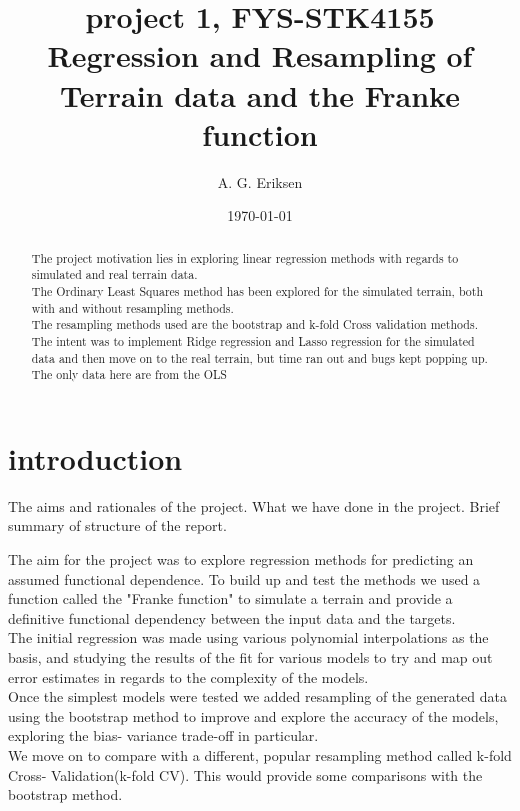 \documentclass[12pt]{revtex4-2}
\begin{document}
\title{%
	project 1, FYS-STK4155 \\
	\large Regression and Resampling of Terrain data and the Franke function}
\author{A. G. Eriksen}
\date{\today}
\begin{abstract}
	The project motivation lies in exploring linear regression methods with regards 
	to simulated and real terrain data. \\
	The Ordinary Least Squares method has been explored for the simulated terrain, 
	both with and without resampling methods. \\
	The resampling methods used are the bootstrap and k-fold Cross validation 
	methods. \\
	The intent was to implement Ridge regression and Lasso regression for 
	the simulated data and then move on to the real terrain, but time ran out and 
	bugs kept popping up. The only data here are from the OLS
\end{abstract}
\maketitle
\tableofcontents

\section{introduction}
The aims and rationales of the project. What we have done in the project. Brief 
summary of structure of the report. 

The aim for the project was to explore regression methods for predicting an assumed 
functional dependence. To build up and test the methods we used a function called the
"Franke function"\cite{franke1979critical} to simulate a terrain and provide a definitive
functional dependency between the input data and the targets. \\

The initial regression was made using various polynomial interpolations as the basis, 
and studying the results of the fit for various models to try and map out error 
estimates in regards to the complexity of the models. \\

Once the simplest models were tested we added resampling of the generated data using the 
bootstrap method to improve and explore the accuracy of the models, exploring the bias-
variance trade-off in particular. \\

We move on to compare with a different, popular resampling method called k-fold Cross-
Validation(k-fold CV). This would provide some comparisons with the bootstrap method.
\end{document}
